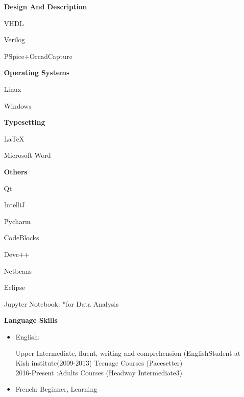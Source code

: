 \documentclass[a4paper,12pt,final]{memoir}
\newcommand{\SmallSep}{\vspace{0.5em}}
\newcommand{\CVItem}[1]
	{\textbf{\color{RoyalBlue} #1}}
\begin{document}
\CVItem{Design And Description}
\begin{multicols}{3}
\begin{compactitem}[\color{RoyalBlue}$\circ$]

	\item VHDL
	\item Verilog
	\item PSpice+OrcadCapture

	
\end{compactitem}
\end{multicols}
\SmallSep

\CVItem{Operating Systems}
\begin{multicols}{3}
\begin{compactitem}[\color{RoyalBlue}$\circ$]
	\item Linux
	\item Windows
\end{compactitem}
\end{multicols}
\SmallSep
\CVItem{Typesetting}
\begin{multicols}{3}
\begin{compactitem}[\color{RoyalBlue}$\circ$]
	\item LaTeX
	\item Microsoft Word
\end{compactitem}
\end{multicols}
\SmallSep
\CVItem{Others}
\begin{multicols}{3}
\begin{compactitem}[\color{RoyalBlue}$\circ$]
	\item Qt
	\item IntelliJ
	\item Pycharm
    	\item  CodeBlocks
    		\item Devc++
    			\item Netbeans
    			\item Eclipse
    			\item Jupyter Notebook:
    			*for Data Analysis
    			
    
    			
    		
    			
\end{compactitem}
\end{multicols}


\SmallSep
\CVItem{Language Skills}
	\begin{itemize}[$\circ$]

\item English: 

Upper Intermediate, fluent, writing and comprehension
(EnglishStudent at Kish institute(2009-2013) Teenage Courses (Pacesetter)  \\
2016-Present :Adults Courses (Headway Intermediate3)
\item French: Beginner, Learning
	\end{itemize}
\end{document}
